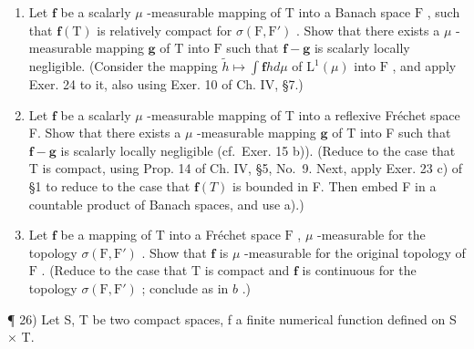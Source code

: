 \begin{enumerate}
\def\labelenumi{\alph{enumi})}
\item
  Let \(\mathbf{f}\) be a scalarly \(\mu\) -measurable mapping of \(\mathrm{T}\) into a Banach space \(\mathrm{F}\) , such that \(\mathbf{f}(\mathrm{T})\) is relatively compact for \(\sigma(\mathrm{F},\mathrm{F}')\) . Show that there exists a \(\mu\) -measurable mapping \(\mathbf{g}\) of \(\mathrm{T}\) into \(\mathrm{F}\) such that \(\mathbf{f} - \mathbf{g}\) is scalarly locally negligible. (Consider the mapping \(\widetilde{h} \mapsto \int \mathbf{f}h d\mu\) of \(\mathrm{L}^1(\mu)\) into \(\mathrm{F}\) , and apply Exer. 24 to it, also using Exer. 10 of Ch. IV, §7.)
\item
  Let \(\mathbf{f}\) be a scalarly \(\mu\) -measurable mapping of T into a reflexive Fréchet space F. Show that there exists a \(\mu\) -measurable mapping \(\mathbf{g}\) of T into F such that \(\mathbf{f} - \mathbf{g}\) is scalarly locally negligible (cf.~Exer. 15 b)). (Reduce to the case that T is compact, using Prop. 14 of Ch. IV, §5, No.~9. Next, apply Exer. 23 c) of §1 to reduce to the case that \(\mathbf{f}(T)\) is bounded in F. Then embed F in a countable product of Banach spaces, and use a).)
\item
  Let \(\mathbf{f}\) be a mapping of \(\mathrm{T}\) into a Fréchet space \(\mathrm{F}\) , \(\mu\) -measurable for the topology \(\sigma(\mathrm{F}, \mathrm{F}')\) . Show that \(\mathbf{f}\) is \(\mu\) -measurable for the original topology of \(\mathrm{F}\) . (Reduce to the case that \(\mathrm{T}\) is compact and \(\mathbf{f}\) is continuous for the topology \(\sigma(\mathrm{F}, \mathrm{F}')\) ; conclude as in \(b\) .)
\end{enumerate}

¶ 26) Let S, T be two compact spaces, f a finite numerical function defined on S × T.


